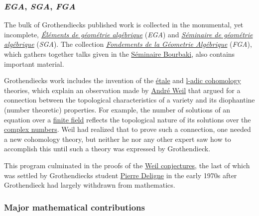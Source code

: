 \subsubsection[\emph{EGA}, \emph{SGA}, \emph{FGA}]{\texorpdfstring{\protect\hypertarget{EGA.2C_SGA.2C_FGA}{}{}\emph{EGA}, \emph{SGA}, \emph{FGA}}{EGA, SGA, FGA}}\label{EGAux2c_SGAux2c_FGA}

The bulk of Grothendieck\textquotesingle s published work is collected in the monumental, yet incomplete, \emph{\href{https://en.wikipedia.org/wiki/Éléments_de_géométrie_algébrique}{Éléments de géométrie algébrique}} (\emph{EGA}) and \emph{\href{https://en.wikipedia.org/wiki/Séminaire_de_géométrie_algébrique}{Séminaire de géométrie algébrique}} (\emph{SGA}). The collection \emph{\href{https://en.wikipedia.org/wiki/Fondements_de_la_Géometrie_Algébrique}{Fondements de la Géometrie Algébrique}} (\emph{FGA}), which gathers together talks given in the \href{https://en.wikipedia.org/wiki/Séminaire_Bourbaki}{Séminaire Bourbaki}, also contains important material.

Grothendieck\textquotesingle s work includes the invention of the \href{https://en.wikipedia.org/wiki/Étale_cohomology}{étale} and \href{https://en.wikipedia.org/wiki/L-adic_cohomology}{l-adic cohomology} theories, which explain an observation made by \href{https://en.wikipedia.org/wiki/André_Weil}{André Weil} that argued for a connection between the topological characteristics of a variety and its diophantine (number theoretic) properties. For example, the number of solutions of an equation over a \href{https://en.wikipedia.org/wiki/Finite_field}{finite field} reflects the topological nature of its solutions over the \href{https://en.wikipedia.org/wiki/Complex_number}{complex numbers}. Weil had realized that to prove such a connection, one needed a new cohomology theory, but neither he nor any other expert saw how to accomplish this until such a theory was expressed by Grothendieck.

This program culminated in the proofs of the \href{https://en.wikipedia.org/wiki/Weil_conjectures}{Weil conjectures}, the last of which was settled by Grothendieck\textquotesingle s student \href{https://en.wikipedia.org/wiki/Pierre_Deligne}{Pierre Deligne} in the early 1970s after Grothendieck had largely withdrawn from mathematics.


\subsubsection{Major mathematical contributions}\label{Major_mathematical_contributions}

